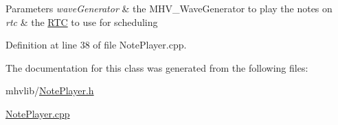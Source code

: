 \begin{DoxyParams}{Parameters}
{\em wave\-Generator} & the M\-H\-V\-\_\-\-Wave\-Generator to play the notes on \\
\hline
{\em rtc} & the \hyperlink{classmhvlib_1_1_r_t_c}{R\-T\-C} to use for scheduling \\
\hline
\end{DoxyParams}


Definition at line 38 of file Note\-Player.\-cpp.



The documentation for this class was generated from the following files\-:\begin{DoxyCompactItemize}
\item 
mhvlib/\hyperlink{_note_player_8h}{Note\-Player.\-h}\item 
\hyperlink{_note_player_8cpp}{Note\-Player.\-cpp}\end{DoxyCompactItemize}
